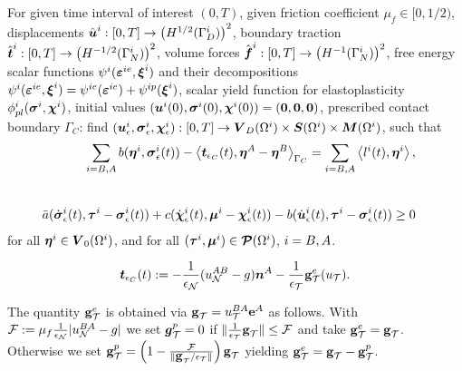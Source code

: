 \documentclass[12pt,a4paper]{scrbook}
\begin{document}
\begin{problem}\label{prob:ElPlWeakRegularizedContact}
 For given  time interval  of interest $(0,T)$, given  friction coefficient $\mu_f \in [0,1/2) $, displacements $\hat{\mbox{\boldmath$u$}}^i: [0,T] \rightarrow \left(H^{1/2}(\Gamma_D^i)\right)^2$, boundary traction 
 $\hat{\mbox{\boldmath$t$}}^i: [0,T] \rightarrow \left(H^{-1/2}(\Gamma_N^i)\right)^2$, volume forces $\hat{\mbox{\boldmath$f$}}^i: [0,T]\rightarrow \left(H^{-1}(\Gamma_N^i)\right)^2$, free energy scalar functions $\psi^i(\mbox{\boldmath$\varepsilon$}^{ie},\mbox{\boldmath$\xi$}^i)$ and their decompositions $\psi^i(\mbox{\boldmath$\varepsilon$}^{ie},\mbox{\boldmath$\xi$}^i)=\psi^{ie}(\mbox{\boldmath$\varepsilon$}^{ie})+\psi^{ip}(\mbox{\boldmath$\xi$}^i)$, scalar yield  function for elastoplasticity $\phi_{pl}^i(\mbox{\boldmath$\sigma$}^i,\mbox{\boldmath$\chi$}^i)$, initial values $(\mbox{\boldmath$u$}^i(0),\mbox{\boldmath$\sigma$}^{i}(0),\mbox{\boldmath$\chi$}^{i}(0))=(\mbox{\boldmath$0$},\mbox{\boldmath$0$},\mbox{\boldmath$0$})$, prescribed contact boundary $\Gamma_C$: 
find $(\mbox{\boldmath$u$}^i_{\epsilon},\mbox{\boldmath$\sigma$}^{i}_{\epsilon},\mbox{\boldmath$\chi$}^i_{\epsilon}): [0,T] \rightarrow \mbox{\boldmath$V$}_D(\Omega^i)\times \mbox{\boldmath$S$}(\Omega^i)\times \mbox{\boldmath$M$}(\Omega^i)$, such that
\begin{eqnarray}
\sum \limits_{i=B,A}  b(\mbox{\boldmath$\eta$}^i,\mbox{\boldmath$\sigma$}^i_{\epsilon}(t))- \left\langle \mbox{\boldmath$t$}_{\epsilon_C}(t), \mbox{\boldmath$\eta$}^{A}-\mbox{\boldmath$\eta$}^{B} \right\rangle_{\Gamma_C}    =\sum \limits_{i=B,A}\left\langle l^{i}(t),\mbox{\boldmath$\eta$}^{i}\right\rangle, & &\label{eq:ElPlContWeakFormMechReg}\\[5ex]
 \bar{a}(\dot{\mbox{\boldmath$\sigma$}}^i_{\epsilon}(t),\mbox{\boldmath$\tau$}^i-\mbox{\boldmath$\sigma$}^i_{\epsilon}(t))+c(\dot{\mbox{\boldmath$\chi$}}^i_{\epsilon}(t),\mbox{\boldmath$\mu$}^i-\mbox{\boldmath$\chi$}^i_{\epsilon}(t))-b(\dot{\mbox{\boldmath$u$}}^i_{\epsilon}(t),\mbox{\boldmath$\tau$}^i-\mbox{\boldmath$\sigma$}^i_{\epsilon}(t))\geq 0 &&\label{eq:ElPlContWeakFormPlastReg} 
\end{eqnarray}
for all $\mbox{\boldmath$\eta$}^i \in \mbox{\boldmath$V$}_0(\Omega^i) $, and for all $(\mbox{\boldmath$\tau$}^i,\mbox{\boldmath$\mu$}^i)\in \mbox{\boldmath$\mathcal{P}$}(\Omega^i)$, $i=B,A$.

\begin{equation}\label{eq:RegularizedContactTraction}
\mbox{\boldmath$t$}_{\epsilon_C}(t):=-\frac{1}{\epsilon_{{\mathcal{N}}}}(u_{{\mathcal{N}}}^{AB}-g)\mbox{\boldmath$n$}^{A}-\frac{1}{\epsilon_{{\mathcal{T}}}}\mbox{\boldmath$\mathrm{g}$}^e_{{\mathcal{T}}}(u_{{\mathcal{T}}}).
\end{equation}
\end{problem}
The quantity $\mbox{\boldmath$\mathrm{g}$}_{{\mathcal{T}}}^e$ is obtained via $\mbox{\boldmath$\mathrm{g}$}_{{\mathcal{T}}}=u^{BA}_{{\mathcal{T}}}\mbox{\boldmath${\mathrm e}$}^{A}$ as follows. 
With ${\cal F}:=\mu_f\frac{1}{\epsilon_{{\mathcal{N}}}}|u^{BA}_{{\mathcal{N}}}-g|$ we set $\mbox{\boldmath$g$} _{{\mathcal{T}}}^p=0$ if
$\|\frac{1}{\epsilon_{{\mathcal{T}}}}\mbox{\boldmath$\mathrm{g}$} _{{\mathcal{T}}}\|\leq {\cal F}$ and take $\mbox{\boldmath$\mathrm{g}$} _{{\mathcal{T}}}^e=\mbox{\boldmath$\mathrm{g}$} _{{\mathcal{T}}}$. Otherwise we set
$\mbox{\boldmath$\mathrm{g}$} _{{\mathcal{T}}}^p=\left(1-\frac{{\cal F}}{\|\mbox{\boldmath$\mathrm{g}$}_{{\mathcal{T}}}/\epsilon_{{\mathcal{T}}}\|}\right)\mbox{\boldmath$\mathrm{g}$} _{{\mathcal{T}}}$ yielding
$\mbox{\boldmath$\mathrm{g}$} _{{\mathcal{T}}}^e=\mbox{\boldmath$\mathrm{g}$}_{{\mathcal{T}}}-\mbox{\boldmath$\mathrm{g}$} _{{\mathcal{T}}}^p$. 
\end{document}
